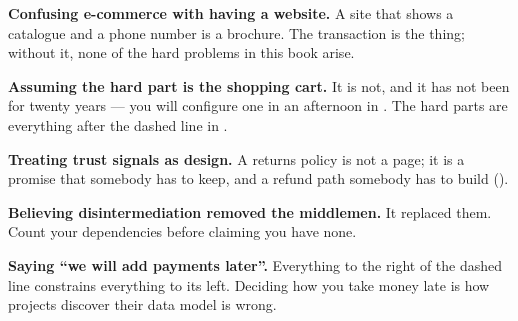 \begin{pitfall}
\begin{tight}
  \item \textbf{Confusing e-commerce with having a website.} A site that shows a
        catalogue and a phone number is a brochure. The transaction is the
        thing; without it, none of the hard problems in this book arise.
  \item \textbf{Assuming the hard part is the shopping cart.} It is not, and it
        has not been for twenty years --- you will configure one in an
        afternoon in . The hard parts are everything after the
        dashed line in .
  \item \textbf{Treating trust signals as design.} A returns policy is not a
        page; it is a promise that somebody has to keep, and a refund path
        somebody has to build ().
  \item \textbf{Believing disintermediation removed the middlemen.} It replaced
        them. Count your dependencies before claiming you have none.
  \item \textbf{Saying ``we will add payments later''.} Everything to the right
        of the dashed line constrains everything to its left. Deciding how you
        take money late is how projects discover their data model is wrong.
\end{tight}
\end{pitfall}

